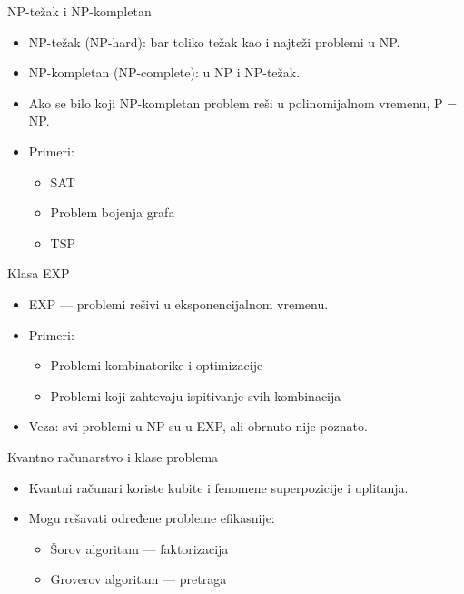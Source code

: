\documentclass[aspectratio=169]{beamer}
\begin{document}
\begin{frame}{NP-težak i NP-kompletan}
\begin{itemize}
    \item NP-težak (NP-hard): bar toliko težak kao i najteži problemi u NP.
    \item NP-kompletan (NP-complete): u NP i NP-težak.
    \item Ako se bilo koji NP-kompletan problem reši u polinomijalnom vremenu, P = NP.
    \item Primeri:
    \begin{itemize}
        \item SAT
        \item Problem bojenja grafa
        \item TSP
    \end{itemize}
\end{itemize}
\end{frame}

\begin{frame}{Klasa EXP}
\begin{itemize}
    \item EXP — problemi rešivi u eksponencijalnom vremenu.
    \item Primeri:
    \begin{itemize}
        \item Problemi kombinatorike i optimizacije
        \item Problemi koji zahtevaju ispitivanje svih kombinacija
    \end{itemize}
    \item Veza: svi problemi u NP su u EXP, ali obrnuto nije poznato.
\end{itemize}
\end{frame}

\begin{frame}{Kvantno računarstvo i klase problema}
\begin{itemize}
    \item Kvantni računari koriste kubite i fenomene superpozicije i uplitanja.
    \item Mogu rešavati određene probleme efikasnije:
    \begin{itemize}
        \item Šorov algoritam — faktorizacija
        \item Groverov algoritam — pretraga
    \end{itemize}
\end{itemize}
\end{frame}
\end{document}
